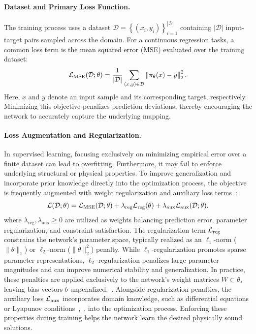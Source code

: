 \paragraph{Dataset and Primary Loss Function.}
The training process uses a dataset $\mathcal{D} = \left\{ (x_i, y_i) \right\}_{i=1}^{|\mathcal{D}|}$ containing $|\mathcal{D}|$ 
input-target pairs sampled across the domain. For a continuous regression tasks, a common loss term is the 
mean squared error (MSE) evaluated over the training dataset:
\begin{equation}
    \label{eq:mse-loss}
    \mathcal{L}_{\mathrm{MSE}}(\mathcal{D}; \theta)
    =
    \frac{1}{|\mathcal{D}|}
    \sum_{(x,y) \in \mathcal{D}}
    \left\|
        \pi_\theta(x) - y
    \right\|_2^2.
\end{equation}
Here, $x$ and $y$ denote an input sample and its corresponding target, respectively. Minimizing this objective 
penalizes prediction deviations, thereby encouraging the network to accurately capture the underlying mapping.


\paragraph{Loss Augmentation and Regularization.}
In supervised learning, focusing exclusively on minimizing empirical error over a finite dataset can lead to overfitting.  
Furthermore, it may fail to enforce underlying structural or physical properties. To improve generalization and 
incorporate prior knowledge directly into the optimization process, the objective is frequently 
augmented with weight regularization and auxiliary loss terms~:
\begin{equation}
    \label{eq:total-loss}
    \mathcal{L}(\mathcal{D}; \theta) =
        \mathcal{L}_{\mathrm{MSE}}(\mathcal{D}; \theta)
        + \lambda_{\mathrm{reg}} \mathcal{L}_{\mathrm{reg}}(\theta)
        + \lambda_{\mathrm{aux}} \mathcal{L}_{\mathrm{aux}}(\mathcal{D}; \theta).
\end{equation}
where $\lambda_{\mathrm{reg}}, \lambda_{\mathrm{aux}} \geq 0$ are utilized as weights balancing prediction error, 
parameter regularization, and constraint satisfaction.
The regularization term $\mathcal{L}_{\mathrm{reg}}$ constrains the network's parameter space, typically realized as an 
$\ell_1$-norm ($\|\theta\|_1$) or $\ell_2$-norm ($\|\theta\|_2^2$) penalty. 
While $\ell_1$-regularization promotes sparse parameter representations, $\ell_2$-regularization 
penalizes large parameter magnitudes and can improve numerical stability and generalization. 
In practice, these penalties are applied exclusively to the network's weight matrices $W \subset \theta$, 
leaving bias vectors $b$ unpenalized.~.
Alongside regularization penalties, the auxiliary loss $\mathcal{L}_{\mathrm{aux}}$ incorporates domain knowledge, such as differential 
equations or Lyapunov conditions~,~\cite{yangLyapunovstableNeuralControl2024}, 
into the optimization process. 
Enforcing these properties during training helps the network learn the desired physically sound solutions.


